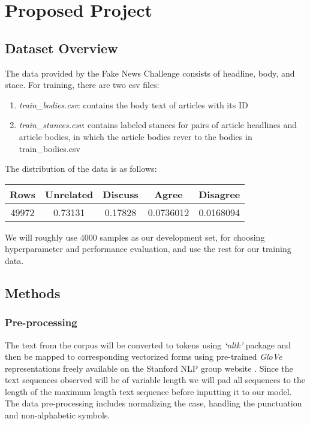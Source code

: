\documentclass[12pt]{article}
\begin{document}
\section{Proposed Project}
\subsection{Dataset Overview}

The data provided by the Fake News Challenge consists of 
headline, body, and stace. 
For training, there are two csv files:
\begin{enumerate}
  \item \textit{train\_bodies.csv}: contains the body text of articles with its ID
  \item \textit{train\_stances.csv}: contains labeled stances for pairs of article 
      headlines and article bodies, in which the article bodies rever to the 
      bodies in train\_bodies.csv
\end{enumerate}

The distribution of the data is as follows:
\begin{center}
  \begin{tabular} 
    {|c|c|c|c|c|}
    \hline
    Rows & Unrelated & Discuss & Agree & Disagree \\
    \hline
    49972 & 0.73131 & 0.17828 & 0.0736012 & 0.0168094 \\
    \hline
  \end{tabular}
\end{center}
We will roughly use 4000 samples as our development set, for choosing 
hyperparameter and performance evaluation, and use the rest for 
our training data. 

\subsection{Methods}
\subsubsection{Pre-processing}

The text from the corpus will be converted to tokens using \textit{‘nltk’} package and 
then be mapped to corresponding vectorized forms using  pre-trained \textit{GloVe} 
representations freely available on the Stanford NLP group website \cite{Bird:2009:NLP:1717171,pennington2014glove}. 
Since the text sequences observed will be of variable length we will pad all 
sequences to the length of the maximum length text sequence before inputting 
it to our model. The data pre-processing includes normalizing the case, handling the punctuation
and non-alphabetic symbols.
\end{document}
